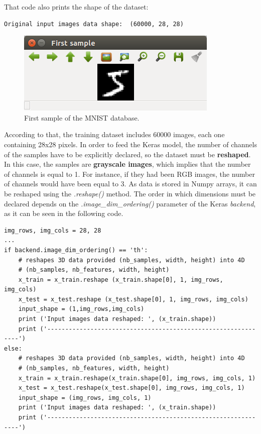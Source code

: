 That code also prints the shape of the dataset:
\begin{Verbatim}[frame=single]
Original input images data shape:  (60000, 28, 28)
\end{Verbatim}

\begin{figure}
	\centering
	\includegraphics[width=0.7\linewidth, keepaspectratio]{figures/first_sample.png}
	\caption{First sample of the MNIST database.}
	\label{fig:firstsample}
\end{figure}

According to that, the training dataset includes 60000 images, each one containing 28x28 pixels. In order to feed the Keras model, the number of channels of the samples have to be explicitly declared, so the dataset must be \textbf{reshaped}. In this case, the samples are \textbf{grayscale images}, which implies that the number of channels is equal to 1. For instance, if they had been RGB images, the number of channels would have been equal to 3. As data is stored in Numpy arrays, it can be reshaped using the \textit{.reshape()} method. The order in which dimensions must be declared depends on the \textit{.image\_dim\_ordering()} parameter of the Keras \textit{backend}, as it can be seen in the following code.
\begin{lstlisting}
img_rows, img_cols = 28, 28
...
if backend.image_dim_ordering() == 'th':
	# reshapes 3D data provided (nb_samples, width, height) into 4D
	# (nb_samples, nb_features, width, height) 
	x_train = x_train.reshape (x_train.shape[0], 1, img_rows, img_cols)
	x_test = x_test.reshape (x_test.shape[0], 1, img_rows, img_cols)
	input_shape = (1,img_rows,img_cols)
	print ('Input images data reshaped: ', (x_train.shape))
	print ('--------------------------------------------------------------')
else:
	# reshapes 3D data provided (nb_samples, width, height) into 4D
	# (nb_samples, nb_features, width, height) 
	x_train = x_train.reshape(x_train.shape[0], img_rows, img_cols, 1)
	x_test = x_test.reshape(x_test.shape[0], img_rows, img_cols, 1)
	input_shape = (img_rows, img_cols, 1)
	print ('Input images data reshaped: ', (x_train.shape))
	print ('--------------------------------------------------------------')
\end{lstlisting}

